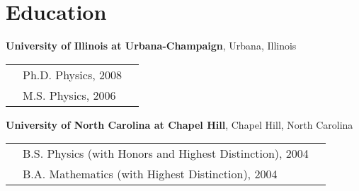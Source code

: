 \section{\sc Education } %
{\bf University of Illinois at Urbana-Champaign}, Urbana, Illinois\\
\vspace*{-.15in}
\begin{tabular}{@{}p{0.4in}p{4.8in}p{1.8in}}
&Ph.D. Physics, 2008 &\\
&M.S. Physics, 2006 &\\
\end{tabular}

\vspace{0.1in}
{\bf University of North Carolina at Chapel Hill}, Chapel Hill, North Carolina\\
\vspace*{-.15in}
\begin{tabular}{@{}p{0.4in}p{4.8in}p{1.8in}}
&B.S. Physics (with Honors and Highest Distinction), 2004 &\\
&B.A. Mathematics (with Highest Distinction), 2004\\
\end{tabular}
\vspace*{0.05in}


